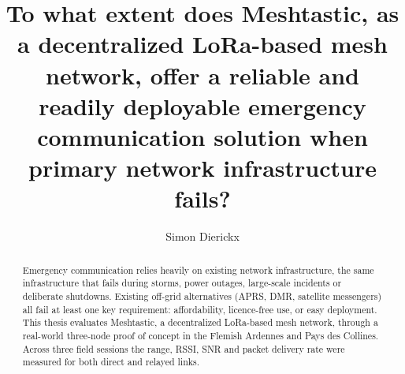 \documentclass[a0,portrait]{hogent-poster}
\title{To what extent does Meshtastic, as a decentralized LoRa-based mesh network, offer a reliable and readily deployable emergency communication solution when primary network infrastructure fails?}
\author{Simon Dierickx}
\begin{document}
\maketitle

\begin{abstract}
Emergency communication relies heavily on existing network infrastructure, the same infrastructure that fails during storms, power outages, large-scale incidents or deliberate shutdowns.
Existing off-grid alternatives (APRS, DMR, satellite messengers) all fail at least one key requirement: affordability, licence-free use, or easy deployment. This thesis evaluates Meshtastic, a decentralized LoRa-based mesh network, through a real-world three-node proof of concept in the Flemish Ardennes and Pays des Collines.
Across three field sessions the range, RSSI, SNR and packet delivery rate were measured for both direct and relayed links.
\end{abstract}
\end{document}
